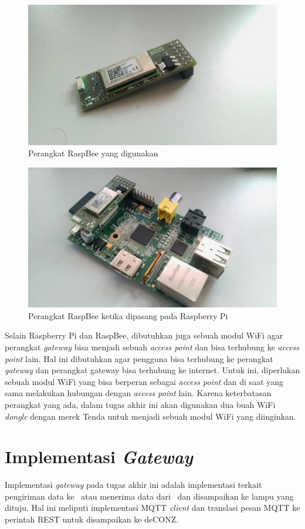 \begin{figure}
	\centering
	\includegraphics[width=.9\textwidth]{pics/raspbee.jpg}
	\caption{Perangkat RaspBee yang digunakan}
	\label{fig:raspbee}
\end{figure}
\begin{figure}
	\centering
	\includegraphics[width=.9\textwidth]{pics/raspberry+raspbee.jpg}
	\caption{Perangkat RaspBee ketika dipasang pada Raspberry Pi}
	\label{fig:raspbeeraspberry}
\end{figure}

Selain Raspberry Pi dan RaspBee, dibutuhkan juga sebuah modul WiFi agar perangkat \textit{gateway} bisa menjadi sebuah \textit{access point} dan bisa terhubung ke \textit{access point} lain. Hal ini dibutuhkan agar pengguna bisa terhubung ke perangkat \textit{gateway} dan perangkat gateway bisa terhubung ke internet. Untuk ini, diperlukan sebuah modul WiFi yang bisa berperan sebagai \textit{access point} dan di saat yang sama melakukan hubungan dengan \textit{access point} lain. Karena keterbatasan perangkat yang ada, dalam tugas akhir ini akan digunakan dua buah WiFi \textit{dongle} dengan merek Tenda untuk menjadi sebuah modul WiFi yang diinginkan. 

\section{Implementasi \textit{Gateway}}
Implementasi \textit{gateway} pada tugas akhir ini adalah implementasi terkait pengiriman data ke \plat~atau menerima data dari \plat~dan disampaikan ke lampu yang dituju. Hal ini meliputi implementasi MQTT \textit{client} dan translasi pesan MQTT ke perintah REST untuk disampaikan ke deCONZ.

